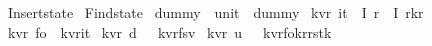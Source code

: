 %
\begin{isabellebody}%
%
%
\isadelimtheory
%
\endisadelimtheory
%
\isatagtheory
{}\isamarkupfalse%
\ Insert{\isacharunderscore}state\isanewline
{}\ Find{\isacharunderscore}state\isanewline
{}%
\endisatagtheory
{\isafoldtheory}%
%
\isadelimtheory
\isanewline
%
\endisadelimtheory
\isanewline
\isanewline
\isanewline
{}\isamarkupfalse%
\ dummy\ {\isacharcolon}{\isacharcolon}\ {\isachardoublequoteopen}unit{\isachardoublequoteclose}\ \ {\isachardoublequoteopen}dummy{\isacharequal}{\isacharparenleft}{\isacharparenright}{\isachardoublequoteclose}\isanewline
\isanewline
\isanewline
\isanewline
{}\isamarkupfalse%
\ {\isacharparenleft}{\isacharprime}k{\isacharcomma}{\isacharprime}v{\isacharcomma}{\isacharprime}r{\isacharparenright}\ i{}{}{\isacharunderscore}t\ {\isacharequal}\ I{}\ {\isacharprime}r\ {\isacharbar}\ I{}\ {\isachardoublequoteopen}{\isacharprime}r{\isacharasterisk}{\isacharprime}k{\isacharasterisk}{\isacharprime}r{\isachardoublequoteclose}\isanewline
\isanewline
{}\isamarkupfalse%
\ {\isacharparenleft}{\isacharprime}k{\isacharcomma}{\isacharprime}v{\isacharcomma}{\isacharprime}r{\isacharparenright}\ fo\ {\isacharequal}\ {\isachardoublequoteopen}{\isacharparenleft}{\isacharprime}k{\isacharcomma}{\isacharprime}v{\isacharcomma}{\isacharprime}r{\isacharparenright}i{}{}{\isacharunderscore}t{\isachardoublequoteclose}\isanewline
\isanewline
{}\isamarkupfalse%
\ {\isacharparenleft}{\isacharprime}k{\isacharcomma}{\isacharprime}v{\isacharcomma}{\isacharprime}r{\isacharparenright}\ d\ \ {\isacharequal}\ {\isachardoublequoteopen}{\isacharparenleft}{\isacharprime}k{\isacharcomma}{\isacharprime}v{\isacharcomma}{\isacharprime}r{\isacharparenright}fs{\isacharasterisk}{\isacharprime}v{\isachardoublequoteclose}\isanewline
{}\isamarkupfalse%
\ {\isacharparenleft}{\isacharprime}k{\isacharcomma}{\isacharprime}v{\isacharcomma}{\isacharprime}r{\isacharparenright}\ u\ \ {\isacharequal}\ {\isachardoublequoteopen}{\isacharparenleft}{\isacharprime}k{\isacharcomma}{\isacharprime}v{\isacharcomma}{\isacharprime}r{\isacharparenright}fo{\isacharasterisk}{\isacharparenleft}{\isacharprime}k{\isacharcomma}{\isacharprime}r{\isacharparenright}rstk{\isachardoublequoteclose}\isanewline
\isanewline

\end{isabellebody}
